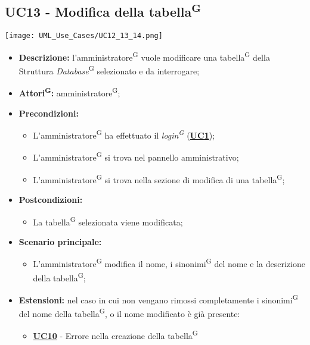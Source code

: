\subsection{UC13 - Modifica della tabella\textsuperscript{G}}
\label{sec:UC13}
\texttt{[image: UML\_Use\_Cases/UC12\_13\_14.png]}
\begin{itemize}
	\item \textbf{Descrizione:} l’amministratore\textsuperscript{G} vuole modificare una tabella\textsuperscript{G} della Struttura \textit{Database}\textsuperscript{G} selezionato e da interrogare;
	\item \textbf{Attori\textsuperscript{G}:} amministratore\textsuperscript{G};
	\item \textbf{Precondizioni:} 
	\begin{itemize}
		\item L’amministratore\textsuperscript{G} ha effettuato il \textit{login\textsuperscript{G}} (\hyperref[sec:UC1]{\textbf{UC1}});
		\item L’amministratore\textsuperscript{G} si trova nel pannello amministrativo;
		\item L’amministratore\textsuperscript{G} si trova nella sezione di modifica di una tabella\textsuperscript{G};
	\end{itemize}
	\item \textbf{Postcondizioni:} 
	\begin{itemize}
		\item La tabella\textsuperscript{G} selezionata viene modificata;
	\end{itemize}
	\item \textbf{Scenario principale:} 
	\begin{itemize}
		\item L’amministratore\textsuperscript{G} modifica il nome, i sinonimi\textsuperscript{G} del nome e la descrizione della tabella\textsuperscript{G};
	\end{itemize}
	\item \textbf{Estensioni:} nel caso in cui non vengano rimossi completamente i sinonimi\textsuperscript{G} del nome della tabella\textsuperscript{G}, o il nome modificato è già presente:
	\begin{itemize}
		\item \hyperref[sec:UC10]{\textbf{UC10}} - Errore nella creazione della tabella\textsuperscript{G}
	\end{itemize}
\end{itemize}

